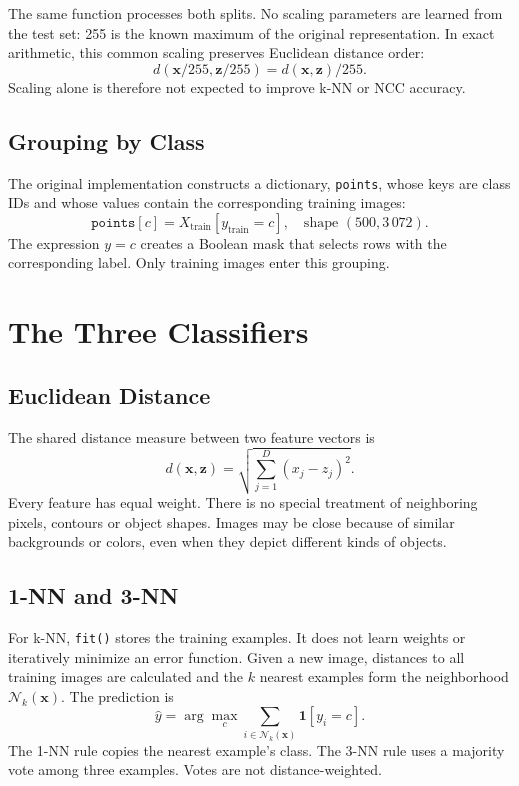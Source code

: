 \documentclass[letterpaper,journal]{IEEEtran}
\newcommand{\code}[1]{\texttt{#1}}
\newcommand{\train}{\mathrm{train}}
\begin{document}
The same function processes both splits. No scaling parameters are learned
from the test set: 255 is the known maximum of the original representation.
In exact arithmetic, this common scaling preserves Euclidean distance order:
\begin{equation}
d(\mathbf{x}/255,\mathbf{z}/255)=d(\mathbf{x},\mathbf{z})/255.
\end{equation}
Scaling alone is therefore not expected to improve k-NN or NCC accuracy.

\subsection{Grouping by Class}
The original implementation constructs a dictionary, \code{points}, whose
keys are class IDs and whose values contain the corresponding training images:
\begin{equation}
\code{points}[c]=X_{\train}[y_{\train}=c],
\quad\text{shape }(500,3\,072).
\end{equation}
The expression $y=c$ creates a Boolean mask that selects rows with the
corresponding label. Only training images enter this grouping.

\section{The Three Classifiers}
\subsection{Euclidean Distance}
The shared distance measure between two feature vectors is
\begin{equation}
d(\mathbf{x},\mathbf{z})=
\sqrt{\sum_{j=1}^{D}(x_j-z_j)^2}.
\label{eq:distance}
\end{equation}
Every feature has equal weight. There is no special treatment of neighboring
pixels, contours or object shapes. Images may be close because of similar
backgrounds or colors, even when they depict different kinds of objects.

\subsection{1-NN and 3-NN}
For k-NN, \code{fit()} stores the training examples. It does not learn weights
or iteratively minimize an error function. Given a new image, distances to
all training images are calculated and the $k$ nearest examples form the
neighborhood $\mathcal{N}_k(\mathbf{x})$. The prediction is
\begin{equation}
\widehat{y}=\arg\max_c\sum_{i\in\mathcal{N}_k(\mathbf{x})}
\mathbf{1}[y_i=c].
\end{equation}
The 1-NN rule copies the nearest example's class. The 3-NN rule uses a
majority vote among three examples. Votes are not distance-weighted.
\end{document}
